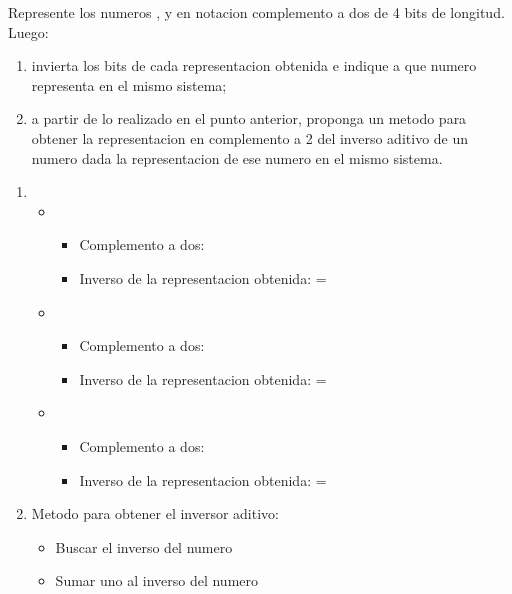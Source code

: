 \begin{enunciado}{\ejercicio}
  Represente los numeros ,  y  en notacion complemento a dos de 4 bits de
  longitud. Luego:

  \begin{enumerate}[label=(\alph*)]
    \item invierta los bits de cada representacion obtenida e indique a que numero representa en
          el mismo sistema;
    \item a partir de lo realizado en el punto anterior, proponga un metodo para obtener la representacion en
          complemento a 2 del inverso aditivo de un numero dada la representacion de ese numero en el mismo
          sistema.
  \end{enumerate}
\end{enunciado}

\begin{enumerate}[label=(\alph*)]
  \item \begin{itemize}
          \item {}
                \begin{itemize}
                  \item Complemento a dos:  
                  \item Inverso de la representacion obtenida:  =  
                \end{itemize}
          \item {}
                \begin{itemize}
                  \item Complemento a dos: 
                  \item Inverso de la representacion obtenida:  =  
                \end{itemize}
          \item {}
                \begin{itemize}
                  \item Complemento a dos: 
                  \item Inverso de la representacion obtenida:  =  
                \end{itemize}
        \end{itemize}
  \item Metodo para obtener el inversor aditivo:
        \begin{itemize}
          \item Buscar el inverso del numero
          \item Sumar uno al inverso del numero
        \end{itemize}
\end{enumerate}

\begin{aportes}
  \item {}
\end{aportes}
